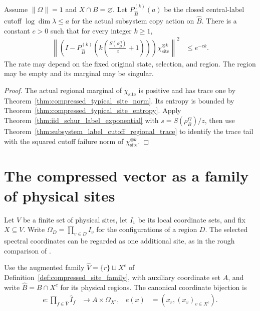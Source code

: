 \begin{theorem}
\label{thm:compressed_typical_regional_exponential_tail}
\leanok
{}
Assume $\|\Omega\|=1$ and $X\cap B=\varnothing$. Let
$P_{\widehat B}^{(k)}(a)$ be the closed central-label cutoff
$\log\dim\lambda\le a$ for the actual subsystem copy action on
$\widehat B$. There is a constant $c>0$ such that for every integer
$k\ge1$,
\begin{align}
 \left\|\left(I-P_{\widehat B}^{(k)}
      \!\left(k\left(\frac{S(\rho_B^\Omega)}{z}+1\right)\right)\right)
      \chi_{\mathrm{site}}^{\otimes k}\right\|^2
 &\le e^{-ck}.
\end{align}
The rate may depend on the fixed original state, selection, and region.
The region may be empty and its marginal may be singular.
\end{theorem}
\begin{proof}
\leanok
The actual regional marginal of $\chi_{\mathrm{site}}$ is positive
and has trace one by Theorem~\ref{thm:compressed_typical_site_norm}.
Its entropy is bounded by Theorem~\ref{thm:compressed_typical_site_entropy}.
Apply Theorem~\ref{thm:iid_schur_label_exponential} with
$s=S(\rho_B^\Omega)/z$, then use
Theorem~\ref{thm:subsystem_label_cutoff_regional_trace} to identify the trace
tail with the squared cutoff failure norm of $\chi_{\mathrm{site}}^{\otimes k}$.
\end{proof}

\section{The compressed vector as a family of physical sites}
\label{sec:compressed_typical_site_coordinates}

Let $V$ be a finite set of physical sites, let $I_v$ be its local
coordinate sets, and fix $X\subseteq V$. Write
$\Omega_D=\prod_{v\in D}I_v$ for the configurations of a region $D$.
The selected spectral coordinates can be regarded as one additional site,
as in the rough comparison of \cite[Section~7]{OpenAI2026AreaLaw}.

Use the augmented family $\widehat V=\{r\}\sqcup X^c$ of
Definition~\ref{def:compressed_site_family}, with auxiliary coordinate set
$A$, and write $\widehat B=B\cap X^c$ for its physical regions.
The canonical coordinate bijection is
\begin{align}
 e:\prod_{f\in\widehat V}\widehat I_f
   &\longrightarrow A\times\Omega_{X^c},
 &e(x)&=(x_r,(x_v)_{v\in X^c}).
\end{align}

